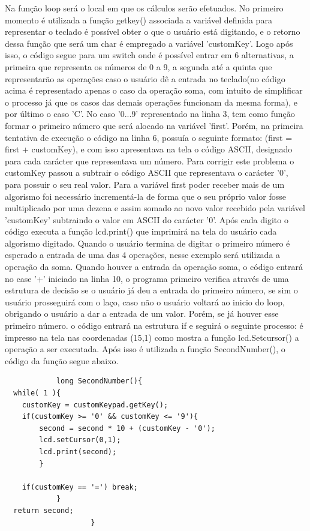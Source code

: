 \documentclass[conference]{IEEEtran}
\begin{document}
        Na função loop será o local em que os cálculos serão
        efetuados. No primeiro momento é utilizada a função getkey()
        associada a variável definida para representar o teclado é
        possível obter o que o usuário está digitando, e o retorno dessa
        função que será um char é empregado a variável 'customKey'.
        Logo após isso, o código segue para um switch onde é possível
        entrar em 6 alternativas, a primeira que representa os números
        de 0 a 9, a segunda até a quinta que representarão as operações
        caso o usuário dê a entrada no teclado(no código acima é
        representado apenas o caso da operação soma, com intuito de
        simplificar o processo já que os casos das demais operações
        funcionam da mesma forma), e por último o caso ’C’.
        No caso ’0...9’ representado na linha 3, tem como função
        formar o primeiro número que será alocado na variável ’first’.
        Porém, na primeira tentativa de execução o código na linha
        6, possuía o seguinte formato: (first = first + customKey),
        e com isso apresentava na tela o código ASCII, designado
        para cada carácter que representava um número. Para corrigir
        este problema o customKey passou a subtrair o código ASCII
        que representava o carácter ’0’, para possuir o seu real valor.
        Para a variável first poder receber mais de um algorismo foi
        necessário incrementá-la de forma que o seu próprio valor
        fosse multiplicado por uma dezena e assim somado ao novo
        valor recebido pela variável ’customKey’ subtraindo o valor
        em ASCII do carácter ’0’. Após cada digito o código executa
        a função lcd.print() que imprimirá na tela do usuário cada
        algorismo digitado.
        Quando o usuário termina de digitar o primeiro número é
        esperado a entrada de uma das 4 operações, nesse exemplo
        será utilizada a operação da soma. Quando houver a entrada
        da operação soma, o código entrará no case ’+’ iniciado na
        linha 10, o programa primeiro verifica através de uma estrutura
        de decisão se o usuário já deu a entrada do primeiro número,
        se sim o usuário prosseguirá com o laço, caso não o usuário
        voltará ao inicio do loop, obrigando o usuário a dar a entrada
        de um valor. Porém, se já houver esse primeiro número. o
        código entrará na estrutura if e seguirá o seguinte processo:
        é impresso na tela nas coordenadas (15,1) como mostra a
        função lcd.Setcursor() a operação a ser executada. Após isso é
        utilizada a função SecondNumber(), o código da função segue
        abaixo.\cite{table2007ascii}
        \begin{lstlisting}
            long SecondNumber(){
  while( 1 ){
    customKey = customKeypad.getKey();
    if(customKey >= '0' && customKey <= '9'){
        second = second * 10 + (customKey - '0');
        lcd.setCursor(0,1);
        lcd.print(second);
        }

    if(customKey == '=') break;
            } 
  return second;
					}
        \end{lstlisting}
        
\end{document}
